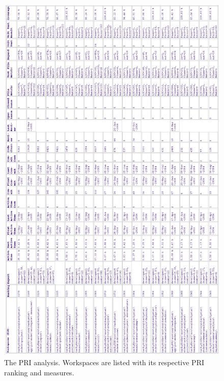 \begin{figure}[htbp]
  \centering
  \includegraphics[height=1.00\textheight]{figs/2005-04-25-cropped-hidden.eps}
  \caption[PRI Ranking analysis]{The PRI analysis. Workspaces are listed
    with its respective PRI ranking and measures.}
  \label{fig:PriRankingAnalysis}
\end{figure}



